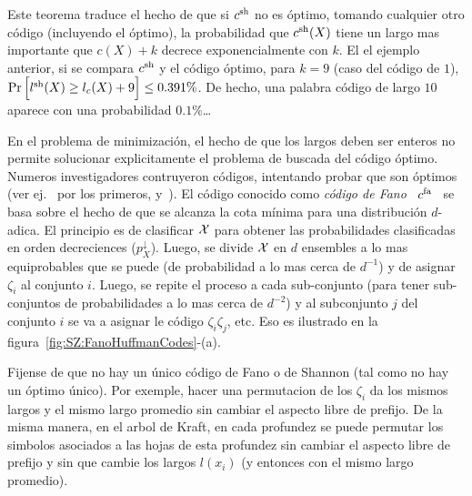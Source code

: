 %
Este  teorema  traduce el  hecho  de  que si  $c^{\mathrm{sh}}$  no  es \'optimo,  tomando
cualquier otro c\'odigo (incluyendo el \'optimo), la probabilidad que $c^{\mathrm{sh}}(X)$
tiene un largo mas importante  que $c(X)+k$ decrece exponencialmente con $k$. El
el ejemplo anterior, si se compara $c^{\mathrm{sh}}$  y el c\'odigo \'optimo, para $k = 9$
(caso del  c\'odigo de  $1$), $\Pr\Big[  l^{\mathrm{sh}}(X) \ge l_c(X)  + 9  \Big] \le
0.391  \%$.  De hecho,  una  palabra  c\'odigo de  largo  $10$  aparece con  una
probabilidad $0.1\%$\ldots

En el problema  de minimizaci\'on, el hecho de que los  largos deben ser enteros
no  permite  solucionar  explicitamente  el  problema de  buscada  del  c\'odigo
\'optimo.  Numeros  investigadores contruyeron c\'odigos,  intentando probar que
son  \'optimos   (ver  ej.~\cite{Sha48,  ShaWea64,  Fan49}   por  los  primeros,
y~\cite[\& ref.]{CovTho06}). El c\'odigo conocido  como {\it c\'odigo de Fano} \
$c^{\mathrm{fa}}$ \  se basa sobre el  hecho de que se  alcanza la cota  m\'inima para una
distribuci\'on $d$-adica.  El  principio es de clasificar $\mathcal{X}$  para obtener las
probabilidades clasificadas en  orden decreciences ($p_X^\downarrow$). Luego, se
divide  $\mathcal{X}$ en  $d$  ensembles a  lo mas  equiprobables  que se  puede (\ie  de
probabilidad a lo mas cerca de $d^{-1}$) y de asignar $\zeta_i$ al conjunto $i$.
Luego, se  repite el  proceso a cada  sub-conjunto (para tener  sub-conjuntos de
probabilidades a lo mas cerca de $d^{-2}$) y al subconjunto $j$ del conjunto $i$
se va  a asignar  le c\'odigo $\zeta_i  \zeta_j$, etc.   Eso es ilustrado  en la
figura~\ref{fig:SZ:FanoHuffmanCodes}-(a).  \SZ{Probar/mencionar que tambi\'en $$
  H(X)  \le L\left( c^\fa \right)  < H(X)+1$$}

Fijense de que no hay un \'unico c\'odigo  de Fano o de Shannon (tal como no hay
un \'optimo  \'unico).  Por exemple, hacer  una permutacion de  los $\zeta_i$ da
los mismos  largos y  el mismo largo  promedio sin  cambiar el aspecto  libre de
prefijo. De la  misma manera, en el  arbol de Kraft, en cada  profundez se puede
permutar los  simbolos asociados a  las hojas de  esta profundez sin  cambiar el
aspecto libre de prefijo y sin que cambie los largos $l(x_i)$ (y entonces con el
mismo largo promedio).


